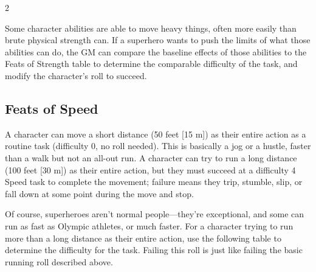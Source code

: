 \begin{multicols}{2}

Some character abilities are able to move heavy things, often more easily than brute physical strength can. If a superhero wants to push the limits of what those abilities can do, the GM can compare the baseline effects of those abilities to the Feats of Strength table to determine the comparable difficulty of the task, and modify the character’s roll to succeed.

\subsection{Feats of Speed} 

A character can move a short distance (50 feet [15 m]) as their entire action as a routine task (difficulty 0, no roll needed). This is basically a jog or a hustle, faster than a walk but not an all-out run. A character can try to run a long distance (100 feet [30 m]) as their entire action, but they must succeed at a difficulty 4 Speed task to complete the movement; failure means they trip, stumble, slip, or fall down at some point during the move and stop.

Of course, superheroes aren’t normal people—they’re exceptional, and some can run as fast as Olympic athletes, or much faster. For a character trying to run more than a long distance as their entire action, use the following table to determine the difficulty for the task. Failing this roll is just like failing the basic running roll described above.

\end{multicols}

